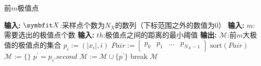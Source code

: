 {	
	\begin{breakablealgorithm}
		\caption{前$m$极值点}\label{alg:maxpoint}
		\begin{algorithmic}[1]
			\Statex \textbf{输入:} $\Vector X$:采样点个数为$N_X$的数列（下标范围之外的数值为0）
			\Statex \textbf{输入:} $m$:需要选出的极值点个数
			\Statex \textbf{输入:} $th$:极值点之间的距离的最小阈值
			\Statex \textbf{输出:} $\mathcal M$:前$m$大极值的极值点的集合
			\State $p_i:=(\vert x_i\vert,i)$
			\EndFor
			\State $Pair:=\begin{bmatrix}p_0&p_1&\ldots&p_{N_X-1}\end{bmatrix}$
			\State $\mathrm{sort}(Pair)$
			\State $\mathcal M:=\{\}$
			\State $p^\prime=p_i.second$
			\State $\mathcal M:=\mathcal M\cup\{p^\prime\}$
			\State break
			\EndIf
			\EndIf
			\EndFor
			\State \Return $\mathcal M$
		\end{algorithmic}
	\end{breakablealgorithm}
}